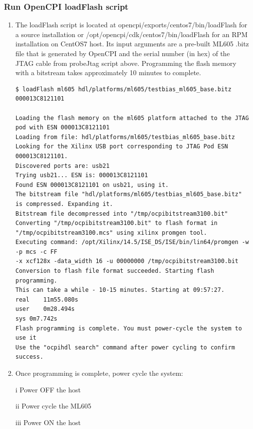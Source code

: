 \subsubsection{Run OpenCPI loadFlash script}
\begin{enumerate}
	\item The loadFlash script is located at
	opencpi/exports/centos7/bin/loadFlash for a source installation or
	/opt/opencpi/cdk/centos7/bin/loadFlash for an RPM installation on
	CentOS7 host. Its input arguments are a pre-built ML605 .bitz
	file that is generated by OpenCPI and the serial number (in hex)
	of the JTAG cable from probeJtag script above. Programming the
	flash memory with a bitstream takes approximately 10 minutes to
	complete.\par\smallskip
	\par
	\noindent{}
	\par\smallskip

	\smallskip
	\begin{verbatim}
$ loadFlash ml605 hdl/platforms/ml605/testbias_ml605_base.bitz 000013C8121101

Loading the flash memory on the ml605 platform attached to the JTAG pod with ESN 000013C8121101
Loading from file: hdl/platforms/ml605/testbias_ml605_base.bitz
Looking for the Xilinx USB port corresponding to JTAG Pod ESN 000013C8121101.
Discovered ports are: usb21
Trying usb21... ESN is: 000013C8121101
Found ESN 000013C8121101 on usb21, using it.
The bitstream file "hdl/platforms/ml605/testbias_ml605_base.bitz" is compressed. Expanding it.
Bitstream file decompressed into "/tmp/ocpibitstream3100.bit"
Converting "/tmp/ocpibitstream3100.bit" to flash format in
"/tmp/ocpibitstream3100.mcs" using xilinx promgen tool.
Executing command: /opt/Xilinx/14.5/ISE_DS/ISE/bin/lin64/promgen -w -p mcs -c FF
-x xcf128x -data_width 16 -u 00000000 /tmp/ocpibitstream3100.bit
Conversion to flash file format succeeded. Starting flash programming.
This can take a while - 10-15 minutes. Starting at 09:57:27.
real	11m55.080s
user	0m28.494s
sys	0m7.742s
Flash programming is complete. You must power-cycle the system to use it
Use the "ocpihdl search" command after power cycling to confirm success.
	\end{verbatim}
	\item Once programming is complete, power cycle the system:
	\item[i]Power OFF the host
	\item[ii]Power cycle the ML605
	\item[iii]Power ON the host
\end{enumerate}

